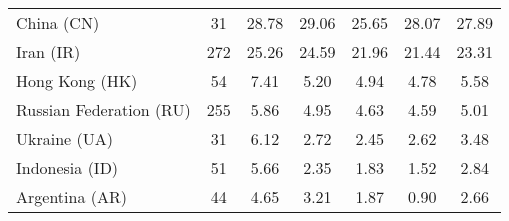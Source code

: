 \begin{table}[h!]
{\begin{tabular}{lcccccc}
China (CN) & \color{black} 31 & {\cellcolor[HTML]{7CB7DA}} \color[HTML]{000000} \color{black} 28.78 & {\cellcolor[HTML]{6AAED6}} \color[HTML]{F1F1F1} \color{black} 29.06 & {\cellcolor[HTML]{F7FBFF}} \color[HTML]{000000} \color{black} 25.65 & {\cellcolor[HTML]{A5CDE3}} \color[HTML]{000000} \color{black} 28.07 & \color{black} 27.89 \\
Iran (IR) & \color{black} 272 & {\cellcolor[HTML]{6AAED6}} \color[HTML]{F1F1F1} \color{black} 25.26 & {\cellcolor[HTML]{8FC2DE}} \color[HTML]{000000} \color{black} 24.59 & {\cellcolor[HTML]{EAF2FB}} \color[HTML]{000000} \color{black} 21.96 & {\cellcolor[HTML]{F7FBFF}} \color[HTML]{000000} \color{black} 21.44 & \color{black} 23.31 \\
Hong Kong (HK) & \color{black} 54 & {\cellcolor[HTML]{6AAED6}} \color[HTML]{F1F1F1} \color{black} 7.41 & {\cellcolor[HTML]{E7F1FA}} \color[HTML]{000000} \color{black} 5.20 & {\cellcolor[HTML]{F1F7FD}} \color[HTML]{000000} \color{black} 4.94 & {\cellcolor[HTML]{F7FBFF}} \color[HTML]{000000} \color{black} 4.78 & \color{black} 5.58 \\
Russian Federation (RU) & \color{black} 255 & {\cellcolor[HTML]{6AAED6}} \color[HTML]{F1F1F1} \color{black} 5.86 & {\cellcolor[HTML]{DBE9F6}} \color[HTML]{000000} \color{black} 4.95 & {\cellcolor[HTML]{F4F9FE}} \color[HTML]{000000} \color{black} 4.63 & {\cellcolor[HTML]{F7FBFF}} \color[HTML]{000000} \color{black} 4.59 & \color{black} 5.01 \\
Ukraine (UA) & \color{black} 31 & {\cellcolor[HTML]{6CAED6}} \color[HTML]{F1F1F1} \color{black} 6.12 & {\cellcolor[HTML]{F0F6FD}} \color[HTML]{000000} \color{black} 2.72 & {\cellcolor[HTML]{F7FBFF}} \color[HTML]{000000} \color{black} 2.45 & {\cellcolor[HTML]{F3F8FE}} \color[HTML]{000000} \color{black} 2.62 & \color{black} 3.48 \\
Indonesia (ID) & \color{black} 51 & {\cellcolor[HTML]{6AAED6}} \color[HTML]{F1F1F1} \color{black} 5.66 & {\cellcolor[HTML]{E3EEF9}} \color[HTML]{000000} \color{black} 2.35 & {\cellcolor[HTML]{F0F6FD}} \color[HTML]{000000} \color{black} 1.83 & {\cellcolor[HTML]{F7FBFF}} \color[HTML]{000000} \color{black} 1.52 & \color{black} 2.84 \\
Argentina (AR) & \color{black} 44 & {\cellcolor[HTML]{6CAED6}} \color[HTML]{F1F1F1} \color{black} 4.65 & {\cellcolor[HTML]{B4D3E9}} \color[HTML]{000000} \color{black} 3.21 & {\cellcolor[HTML]{DDEAF7}} \color[HTML]{000000} \color{black} 1.87 & {\cellcolor[HTML]{F7FBFF}} \color[HTML]{000000} \color{black} 0.90 & \color{black} 2.66 \\

\end{tabular}}
\end{table}
